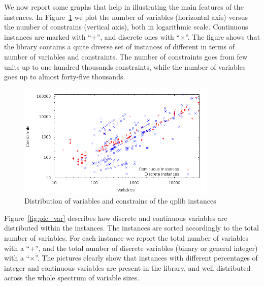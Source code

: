We now report some graphs that help in illustrating the main features
of the instences. In Figure~\ref{fig:distribution} we plot the number
of variables (horizontal axis) versus the number of constrains
(vertical axis), both in logarithmic scale. Continuous instances are
marked with ``$+$'', and discrete ones with ``$\times$''. The figure shows
that the library contains a quite diverse set of instances of different in
terms of number of variables and constraints. The number of constraints goes
from few units up to one hundred thousands constraints, while the number of
variables goes up to almost forty-five thousands.

\begin{figure}\centering
  \includegraphics[width=0.85\textwidth]{pic_overview.png}
  \caption{Distribution of variables and constrains  of the qplib
instances \label{fig:distribution}}
\end{figure}

Figure~\ref{fig:pic_var} 
describes how discrete and continuous
variables are distributed within the instances. The instances are
sorted accordingly to the total number of variables.
For each instance we report the total number of variables with a ``$+$'', and the total number of discrete variables (binary or general integer) with a ``$\times$''. The pictures clearly show that instances with different percentages of integer and continuous variables are present in the library, and well distributed across the whole spectrum of variable sizes.

